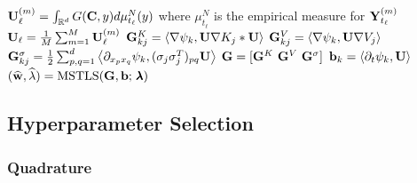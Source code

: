 \documentclass[english,reqno]{amsart}
\begin{document}
\begin{algorithm}
	\caption{ WSINDy for Particle Systems \\ $(\what, \, \hat{\lambda}) =$ \textbf{WSINDy}$(\pmb{\Ybb},\tbf\,;\ G,\,\Cbf,\, \Lbb,\,\Psi,\,\lan \cdot,\cdot\ran,\,\pmb{\lambda})$}
	\label{alg:wsindypde}
	\begin{algorithmic}[1]
				\STATE $\mathbf{U}_\ell^{(m)} = \int_{\mathbb{R}^d} G(\mathbf{C},y)d\mu^N_{t_\ell}(y)$ where $\mu^N_{t_\ell}$ is the empirical measure for $\mathbf{Y}_{t_\ell}^{(m)}$ 
		\ENDFOR
		\STATE $\mathbf{U}_\ell = \frac{1}{M}\sum_{m=1}^M \mathbf{U}_\ell^{(m)}$
		\ENDFOR
		\STATE
				\STATE $\mathbf{G}_{kj}^K =  \left\langle \nabla \psi_k, \mathbf{U} \nabla K_j*\mathbf{U} \right\rangle$
			\ENDFOR
		\ENDFOR
		\STATE
				\STATE $\mathbf{G}_{kj}^V =  \left\langle \nabla \psi_k, \mathbf{U} \nabla V_j \right\rangle$
			\ENDFOR
		\ENDFOR
		\STATE
				\STATE $\mathbf{G}_{kj}^\sigma =  \frac{1}{2}\sum_{p,q=1}^d \left\langle \partial_{x_px_q}\psi_k, (\sigma_j\sigma_j^T)_{pq} \mathbf{U} \right\rangle$
			\ENDFOR
		\ENDFOR
		\STATE $\mathbf{G} = [\mathbf{G}^K\ \mathbf{G}^V\ \mathbf{G}^\sigma]$
		\STATE
			\STATE $\mathbf{b}_k = \left\langle \partial_t \psi_k, \mathbf{U}\right\rangle$
		\ENDFOR
		\STATE
		\STATE $(\widehat{\mathbf{w}},\widehat{\lambda}) = \text{MSTLS}(\mathbf{G},\mathbf{b};\, \pmb{\lambda})$
\end{algorithmic}\label{alg1}
\end{algorithm}

\subsection{Hyperparameter Selection}\label{sec:hype}
\subsubsection{Quadrature}
\end{document}
